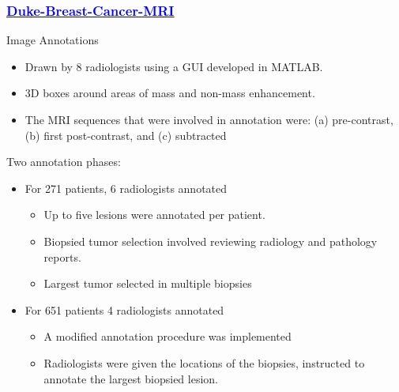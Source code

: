 \documentclass{beamer}
\begin{document}
    \begin{frame}
        \frametitle{ \href{https://nbia.cancerimagingarchive.net/viewer/?study=1.3.6.1.4.1.14519.5.2.1.186051521067863971269584893740842397538&series=1.3.6.1.4.1.14519.5.2.1.185777849803665244536713316058283493877&token=5a3745db-7523-4fb2-bb86-c9bd67585b61}{\underline{\textcolor{blue}{Duke-Breast-Cancer-MRI}}}}

        \begin{block}{Image Annotations}
            \begin{itemize}
                \item Drawn by 8 radiologists using a GUI developed in MATLAB.
                \item 3D boxes around areas of mass and non-mass enhancement.
                \item The MRI sequences that were involved in annotation were: (a) pre-contrast, (b) first post-contrast, and (c) subtracted
            \end{itemize}
            \item Two annotation phases:
            \begin{itemize}
                \item For 271 patients, 6 radiologists annotated
                    \begin{itemize}
                        \item Up to five lesions were annotated per patient.
                        \item Biopsied tumor selection involved reviewing radiology and pathology reports.
                        \item Largest tumor selected in  multiple biopsies
                    \end{itemize}
                \item For 651 patients 4 radiologists annotated
                    \begin{itemize}
                        \item A modified annotation procedure was implemented
                        \item Radiologists were given the locations of the biopsies, instructed to annotate the largest biopsied lesion.
                    \end{itemize}
            \end{itemize}
        \end{block}
    \end{frame}
\end{document}
